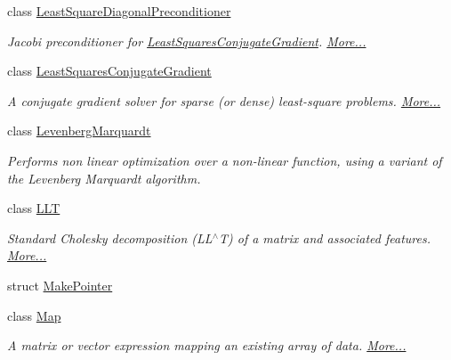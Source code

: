\begin{DoxyCompactItemize}
class \hyperlink{group___iterative_linear_solvers___module_class_eigen_1_1_least_square_diagonal_preconditioner}{Least\+Square\+Diagonal\+Preconditioner}
\begin{DoxyCompactList}\small\item\em Jacobi preconditioner for \hyperlink{group___iterative_linear_solvers___module_class_eigen_1_1_least_squares_conjugate_gradient}{Least\+Squares\+Conjugate\+Gradient}.  \hyperlink{group___iterative_linear_solvers___module_class_eigen_1_1_least_square_diagonal_preconditioner}{More...}\end{DoxyCompactList}\item 
class \hyperlink{group___iterative_linear_solvers___module_class_eigen_1_1_least_squares_conjugate_gradient}{Least\+Squares\+Conjugate\+Gradient}
\begin{DoxyCompactList}\small\item\em A conjugate gradient solver for sparse (or dense) least-\/square problems.  \hyperlink{group___iterative_linear_solvers___module_class_eigen_1_1_least_squares_conjugate_gradient}{More...}\end{DoxyCompactList}\item 
class \hyperlink{class_eigen_1_1_levenberg_marquardt}{Levenberg\+Marquardt}
\begin{DoxyCompactList}\small\item\em Performs non linear optimization over a non-\/linear function, using a variant of the Levenberg Marquardt algorithm. \end{DoxyCompactList}\item 
class \hyperlink{group___cholesky___module_class_eigen_1_1_l_l_t}{L\+LT}
\begin{DoxyCompactList}\small\item\em Standard Cholesky decomposition (L\+L$^\wedge$T) of a matrix and associated features.  \hyperlink{group___cholesky___module_class_eigen_1_1_l_l_t}{More...}\end{DoxyCompactList}\item 
struct \hyperlink{struct_eigen_1_1_make_pointer}{Make\+Pointer}
\item 
class \hyperlink{group___core___module_class_eigen_1_1_map}{Map}
\begin{DoxyCompactList}\small\item\em A matrix or vector expression mapping an existing array of data.  \hyperlink{group___core___module_class_eigen_1_1_map}{More...}\end{DoxyCompactList}\item 

\end{DoxyCompactItemize}

